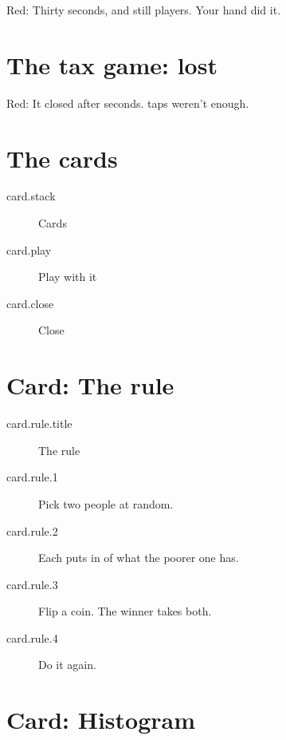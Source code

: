 Red: Thirty seconds, and still  players.
Your hand did it.

\section{The tax game: lost}\label{game:lost}

Red: It closed after  seconds.
 taps weren't enough.

\section{The cards}\label{cards}

\begin{description}
  \item[card.stack] Cards
  \item[card.play] Play with it
  \item[card.close] Close
\end{description}

\section{Card: The rule}\label{card:rule}

\begin{description}
  \item[card.rule.title] The rule
  \item[card.rule.1] Pick two people at random.
  \item[card.rule.2] Each puts in  of what the poorer one has.
  \item[card.rule.3] Flip a coin. The winner takes both.
  \item[card.rule.4] Do it again.
\end{description}



\section{Card: Histogram}\label{card:histogram}

